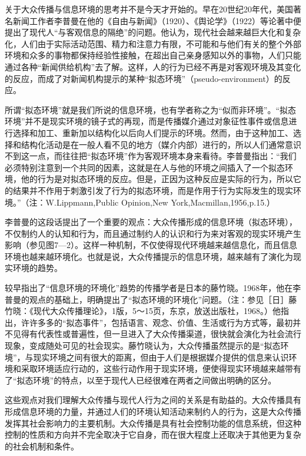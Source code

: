 \documentclass[UTF8,12pt]{ctexart}
\numberwithin{equation}{section} %
\numberwithin{figure}{section}
\numberwithin{table}{section}
\begin{document}
	关于大众传播与信息环境的思考并不是今天才开始的。早在20世纪20年代，美国著名新闻工作者李普曼在他的《自由与新闻》（1920）、《舆论学》（1922）等论著中便提出了现代人“与客观信息的隔绝”的问题。他认为，现代社会越来越巨大化和复杂化，人们由于实际活动范围、精力和注意力有限，不可能和与他们有关的整个外部环境和众多的事物都保持经验性接触，在超出自己亲身感知以外的事物，人们只能通过各种“新闻供给机构”去了解。这样，人的行为已经不再是对客观环境及其变化的反应，而成了对新闻机构提示的某种“拟态环境”（pseudo-environment）的反应。
	
	所谓“拟态环境”就是我们所说的信息环境，也有学者称之为“似而非环境”。“拟态环境”并不是现实环境的镜子式的再现，而是传播媒介通过对象征性事件或信息进行选择和加工、重新加以结构化以后向人们提示的环境。然而，由于这种加工、选择和结构化活动是在一般人看不见的地方（媒介内部）进行的，所以人们通常意识不到这一点，而往往把“拟态环境”作为客观环境本身来看待。李普曼指出：“我们必须特别注意到一个共同的因素，这就是在人与他的环境之间插入了一个拟态环境，他的行为是对拟态环境的反应。但是，正因为这种反应是实际的行为，所以它的结果并不作用于刺激引发了行为的拟态环境，而是作用于行为实际发生的现实环境。”（注：W.Lippmann,Public Opinion,New York,Macmillan,1956,p.15.）
	
	李普曼的这段话提出了一个重要的观点：大众传播形成的信息环境（拟态环境），不仅制约人的认知和行为，而且通过制约人的认识和行为来对客观的现实环境产生影响（参见图7—2）。这样一种机制，不仅使得现代环境越来越信息化，而且信息环境也越来越环境化。也就是说，大众传播提示的信息环境，越来越有了演化为现实环境的趋势。
	
	较早指出了“信息环境的环境化”趋势的传播学者是日本的藤竹晓。1968年，他在李普曼的观点的基础上，明确提出了“拟态环境的环境化”问题。（注：参见［日］藤竹晓：《现代大众传播理论》，1版，5～15页，东京，放送出版社，1968。）他指出，许许多多的“拟态事件”，包括语言、观念、价值、生活或行为方式等，最初并不见得有代表性或普遍性，但一旦进入了大众传播渠道，很快就会演化为社会流行现象，变成随处可见的社会现实。藤竹晓认为，大众传播虽然提示的是“拟态环境”，与现实环境之间有很大的距离，但由于人们是根据媒介提供的信息来认识环境和采取环境适应行动的，这些行动作用于现实环境，便使得现实环境越来越带有了“拟态环境”的特点，以至于现代人已经很难在两者之间做出明确的区分。
	
	这些观点对我们理解大众传播与现代人行为之间的关系是有助益的。大众传播具有形成信息环境的力量，并通过人们的环境认知活动来制约人的行为，这是大众传播发挥其社会影响力的主要机制。大众传播是具有社会控制功能的信息系统，但这种控制的性质和方向并不完全取决于它自身，而在很大程度上还取决于其他更为复杂的社会机制和条件。
	
\end{document}
